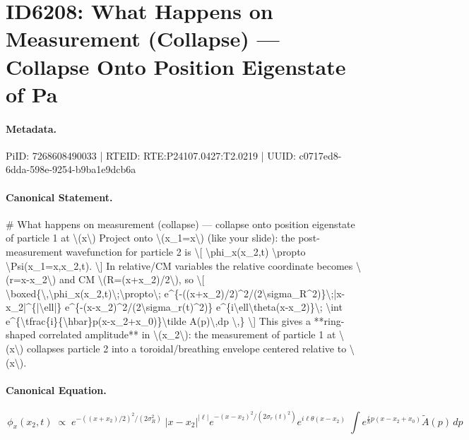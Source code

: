 \section*{ID6208: What Happens on Measurement (Collapse) — Collapse Onto Position Eigenstate of Pa}
\paragraph{Metadata.}
PiID: 7268608490033 | RTEID: RTE:P24107.0427:T2.0219 | UUID: c0717ed8-6dda-598e-9254-b9ba1e9dcb6a

\paragraph{Canonical Statement.}
\# What happens on measurement (collapse) — collapse onto position eigenstate of particle 1 at \textbackslash{}(x\textbackslash{}) Project onto \textbackslash{}(x\_1=x\textbackslash{}) (like your slide): the post-measurement wavefunction for particle 2 is \textbackslash{}[ \textbackslash{}phi\_x(x\_2,t) \textbackslash{}propto \textbackslash{}Psi(x\_1=x,x\_2,t). \textbackslash{}] In relative/CM variables the relative coordinate becomes \textbackslash{}(r=x-x\_2\textbackslash{}) and CM \textbackslash{}(R=(x+x\_2)/2\textbackslash{}), so \textbackslash{}[ \textbackslash{}boxed\{\textbackslash{},\textbackslash{}phi\_x(x\_2,t)\textbackslash{};\textbackslash{}propto\textbackslash{}; e\textasciicircum{}\{-((x+x\_2)/2)\textasciicircum{}2/(2\textbackslash{}sigma\_R\textasciicircum{}2)\}\textbackslash{};|x-x\_2|\textasciicircum{}\{|\textbackslash{}ell|\} e\textasciicircum{}\{-(x-x\_2)\textasciicircum{}2/(2\textbackslash{}sigma\_r(t)\textasciicircum{}2)\} e\textasciicircum{}\{i\textbackslash{}ell\textbackslash{}theta(x-x\_2)\}\textbackslash{}; \textbackslash{}int e\textasciicircum{}\{\textbackslash{}tfrac\{i\}\{\textbackslash{}hbar\}p(x-x\_2+x\_0)\}\textbackslash{}tilde A(p)\textbackslash{},dp \textbackslash{},\} \textbackslash{}] This gives a **ring-shaped correlated amplitude** in \textbackslash{}(x\_2\textbackslash{}): the measurement of particle 1 at \textbackslash{}(x\textbackslash{}) collapses particle 2 into a toroidal/breathing envelope centered relative to \textbackslash{}(x\textbackslash{}).

\paragraph{Canonical Equation.}
\[
\boxed{\,\phi_x(x_2,t)\;\propto\; e^{-((x+x_2)/2)^2/(2\sigma_R^2)}\;|x-x_2|^{|\ell|} e^{-(x-x_2)^2/(2\sigma_r(t)^2)} e^{i\ell\theta(x-x_2)}\; \int e^{\tfrac{i}{\hbar}p(x-x_2+x_0)}\tilde A(p)\,dp \,}
\]

